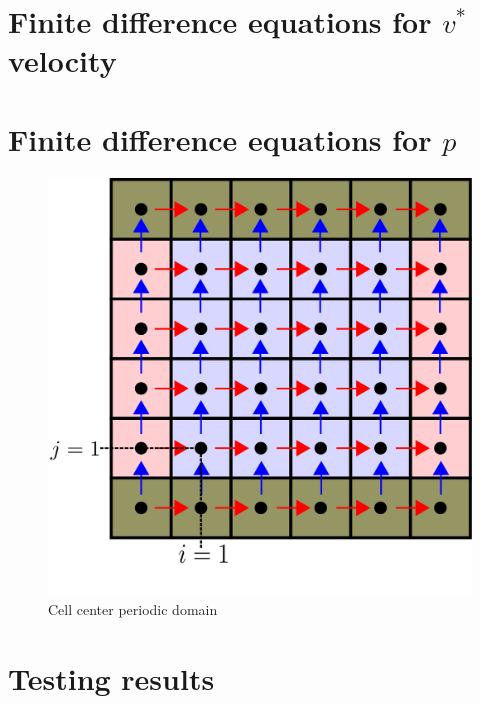 \documentclass[12pt]{article}
\begin{document}

\section{Finite difference equations for $v^{\ast}$ velocity}
\section{Finite difference equations for $p$}
\begin{figure}[H]
    \includegraphics[height=0.5\textheight]{../../../media/periodic-BCs}
    \caption{Cell center periodic domain}
    \label{fig:periodic-domain}
\end{figure}                                                            

\section{Testing results}

\end{document}
